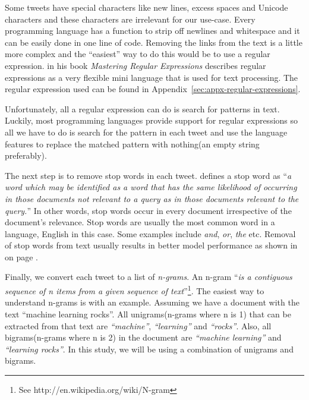 Some tweets have special characters like new lines, excess spaces and Unicode characters and these
characters are irrelevant for our use-case. Every programming language has a function to strip
off newlines and whitespace and it can be easily done in one line of code. Removing the links from
the text is a little more complex and the ``easiest'' way to do this would be to use a regular
expression. \citet{friedl2006mastering} in his book \textit{Mastering Regular Expressions} describes
regular expressions as a very flexible mini language that is used for text processing. The regular
expression used can be found in Appendix~\ref{sec:appx-regular-expressions}.

Unfortunately, all a regular expression can do is search for patterns in text. Luckily, most
programming languages provide support for regular expressions so all we have to do is search for the
pattern in each tweet and use the language features to replace the matched pattern with nothing(an
empty string preferably).

The next step is to remove stop words in each tweet. \citet{wilbur1992automatic} defines a stop word
as ``\textit{a word which may be identified as a word that has the same likelihood of occurring in
those documents not relevant to a query as in those documents relevant to the query.}'' In other
words, stop words occur in every document irrespective of the document's relevance. Stop words are
usually the most common word in a language, English in this case. Some examples include
\textit{and}, \textit{or}, \textit{the} etc. Removal of stop words from text usually results in
better model performance as shown in  on page
\pageref{fig:auc-curves-stopwords}.


Finally, we convert each tweet to a list of \textit{n-grams}. An n-gram ``\textit{is a contiguous
sequence of n items from a given sequence of text}''\footnote{See
http://en.wikipedia.org/wiki/N-gram}. The easiest way to understand n-grams is with an example.
Assuming we have a document with the text ``machine learning rocks''. All unigrams(n-grams
where n is 1) that can be extracted from that text are \textit{``machine''}, \textit{``learning''}
and \textit{``rocks''}. Also, all bigrams(n-grams where n is 2) in the document are
\textit{``machine learning''} and \textit{``learning rocks''}. In this study, we will be using a
combination of unigrams and bigrams.

